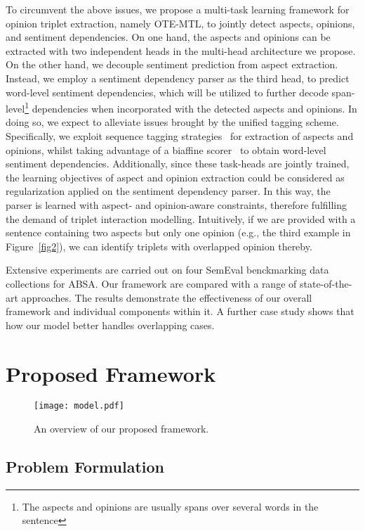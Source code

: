 \documentclass[11pt,a4paper]{article}
\begin{document}
To circumvent the above issues, we propose a multi-task learning framework for opinion triplet extraction, namely OTE-MTL, to jointly detect aspects, opinions, and sentiment dependencies. On one hand, the aspects and opinions can be extracted with two independent heads in the multi-head architecture we propose. On the other hand, we decouple sentiment prediction from aspect extraction. Instead, we employ a sentiment dependency parser as the third head, to predict word-level sentiment dependencies, which will be utilized to further decode span-level\footnote{The aspects and opinions are usually spans over several words in the sentence} dependencies when incorporated with the detected aspects and opinions. In doing so, we expect to alleviate issues brought by the unified tagging scheme. Specifically, we exploit sequence tagging strategies~\cite{lample2016neural} for extraction of aspects and opinions, whilst taking advantage of a biaffine scorer~\cite{dozat2017deep} to obtain word-level sentiment dependencies. Additionally, since these task-heads are jointly trained, the learning objectives of aspect and opinion extraction could be considered as regularization applied on the sentiment dependency parser. In this way, the parser is learned with aspect- and opinion-aware constraints, therefore fulfilling the demand of triplet interaction modelling. Intuitively, if we are provided with a sentence containing two aspects but only one opinion (e.g., the third example in Figure~\ref{fig2}), we can identify triplets with overlapped opinion thereby.

Extensive experiments are carried out on four SemEval benckmarking data collections for ABSA. Our framework are compared with a range of state-of-the-art approaches. The results demonstrate the effectiveness of our overall framework and individual components within it. A further case study shows that how our model better handles overlapping cases. \section{Proposed Framework}

\begin{figure*}
    \centering
    \texttt{[image: model.pdf]}
    \caption{An overview of our proposed framework.}
    \label{fig3}
\end{figure*}

\subsection{Problem Formulation}
\end{document}
